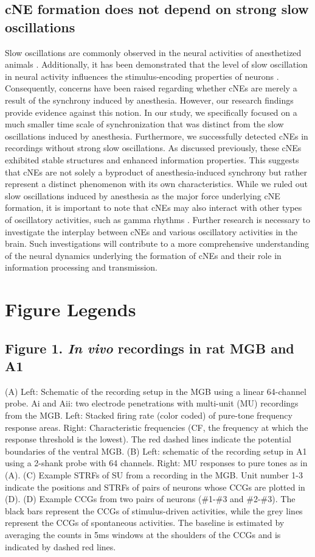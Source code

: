 \documentclass[11pt]{article}
\begin{document}
\subsection*{cNE formation does not depend on strong slow oscillations}
Slow oscillations are commonly observed in the neural activities of anesthetized animals \citep{chauvette2011properties, dasilva2021modulation}. Additionally, it has been demonstrated that the level of slow oscillation in neural activity influences the stimulus-encoding properties of neurons \citep{pachitariu2015state}. Consequently, concerns have been raised regarding whether cNEs are merely a result of the synchrony induced by anesthesia. However, our research findings provide evidence against this notion. In our study, we specifically focused on a much smaller time scale of synchronization that was distinct from the slow oscillations induced by anesthesia. Furthermore, we successfully detected cNEs in recordings without strong slow oscillations. As discussed previously, these cNEs exhibited stable structures and enhanced information properties. This suggests that cNEs are not solely a byproduct of anesthesia-induced synchrony but rather represent a distinct phenomenon with its own characteristics. While we ruled out slow oscillations induced by anesthesia as the major force underlying cNE formation, it is important to note that cNEs may also interact with other types of oscillatory activities, such as gamma rhythms \citep{Oberto2021}. Further research is necessary to investigate the interplay between cNEs and various oscillatory activities in the brain. Such investigations will contribute to a more comprehensive understanding of the neural dynamics underlying the formation of cNEs and their role in information processing and transmission.

\section*{Figure Legends}

\subsection*{Figure 1. \emph{In vivo} recordings in rat MGB and A1}
(A) Left: Schematic of the recording setup in the MGB using a linear 64-channel probe. Ai and Aii: two electrode penetrations with multi-unit (MU) recordings from the MGB. Left: Stacked firing rate (color coded) of pure-tone frequency response areas. Right: Characteristic frequencies (CF, the frequency at which the response threshold is the lowest). The red dashed lines indicate the potential boundaries of the ventral MGB.
(B) Left: schematic of the recording setup in A1 using a 2-shank probe with 64 channels. Right: MU responses to pure tones as in (A).
(C) Example STRFs of SU from a recording in the MGB. Unit number 1-3 indicate the positions and STRFs of pairs of neurons whose CCGs are plotted in (D).
(D) Example CCGs from two pairs of neurons (\#1-\#3 and \#2-\#3). The black bars represent the CCGs of stimulus-driven activities, while the grey lines represent the CCGs of spontaneous activities. The baseline is estimated by averaging the counts in 5ms windows at the shoulders of the CCGs and is indicated by dashed red lines.
\end{document}
